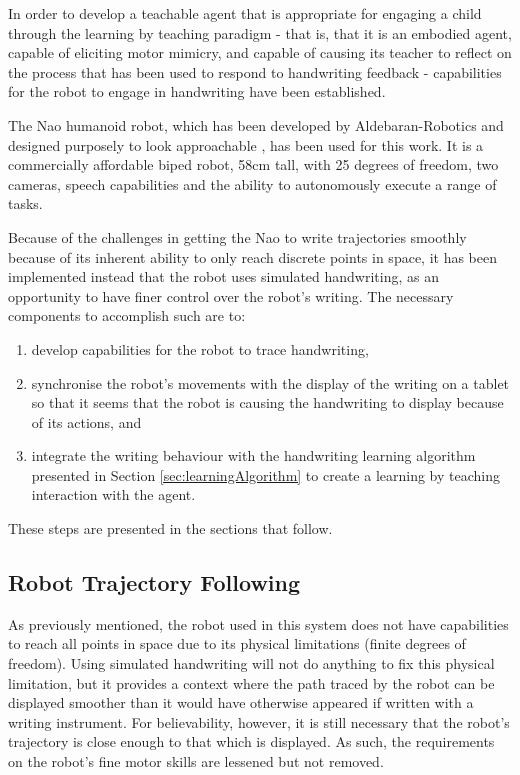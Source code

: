 \documentclass{sig-alternate}
\begin{document}
In order to develop a teachable agent that is appropriate for engaging a child
through the learning by teaching paradigm - that is, that it is an embodied
agent, capable of eliciting motor mimicry, and capable of causing its teacher to
reflect on the process that has been used to respond to handwriting feedback -
capabilities for the robot to engage in handwriting have been established.

The Nao humanoid robot, which has been developed by Aldebaran-Robotics and
designed purposely to look approachable \cite{Gouaillier2008}, has been used for
this work. It is a commercially affordable biped robot, 58cm tall, with 25
degrees of freedom, two cameras, speech capabilities and the ability to
autonomously execute a range of tasks.

Because of the challenges in getting the Nao to write trajectories smoothly
because of its inherent ability to only reach discrete points in space, it has
been implemented instead that the robot uses simulated handwriting, as an
opportunity to have finer control over the robot's writing. The necessary
components to accomplish such are to:

\begin{enumerate}
    \item develop capabilities for the robot to trace handwriting, 

    \item synchronise the robot's movements with the display of the writing on a
        tablet so that it seems that the robot is causing the handwriting to
        display because of its actions, and

    \item integrate the writing behaviour with the handwriting learning
        algorithm presented in Section \ref{sec:learningAlgorithm} to create a
        learning by teaching interaction with the agent. 
\end{enumerate}

These steps are presented in the sections that follow.

\subsection{Robot Trajectory Following}

As previously mentioned, the robot used in this system does not have
capabilities to reach all points in space due to its physical limitations
(finite degrees of freedom). Using simulated handwriting will not do anything to
fix this physical limitation, but it provides a context where the path traced by
the robot can be displayed smoother than it would have otherwise appeared if
written with a writing instrument. For believability, however, it is still
necessary that the robot's trajectory is close enough to that which is
displayed. As such, the requirements on the robot's fine motor skills are
lessened but not removed. 
\end{document}
